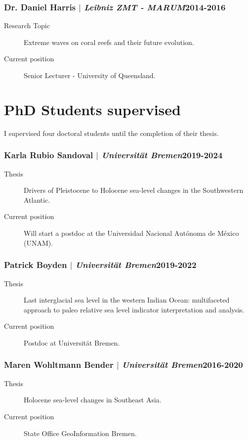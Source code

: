 \documentclass[11pt]{article}
\begin{document}
\smallskip
\subsubsection{Dr. Daniel Harris $|$ {\normalfont\textit{Leibniz ZMT - MARUM}}\hfill 2014-2016}
{\footnotesize 
\begin{description}
  \item [Research Topic] Extreme waves on coral reefs and their future evolution. 
  \item [Current position] Senior Lecturer - University of Queensland. 
\end{description}
}

\section{PhD Students supervised}
{\normalfont I supervised four doctoral students until the completion of their thesis.}\\

\subsubsection{Karla Rubio Sandoval $|$ {\normalfont\textit{Universität Bremen}}\hfill 2019-2024}
{\footnotesize 
\begin{description}
  \item [Thesis] Drivers of Pleistocene to Holocene sea-level changes in the Southwestern Atlantic.
  \item [Current position] Will start a postdoc at the Universidad Nacional Autónoma de México (UNAM). 
\end{description}
}
\smallskip

\subsubsection{Patrick Boyden $|$ {\normalfont\textit{Universität Bremen}}\hfill 2019-2022}
{\footnotesize 
\begin{description}
  \item [Thesis] Last interglacial sea level in the western Indian Ocean: multifaceted approach to paleo relative sea level indicator interpretation and analysis.
  \item [Current position] Postdoc at Universität Bremen. 
\end{description}
}
\smallskip

\subsubsection{Maren Wohltmann Bender $|$ {\normalfont\textit{Universität Bremen}}\hfill 2016-2020}
{\footnotesize 
\begin{description}
  \item [Thesis] Holocene sea-level changes in Southeast Asia.
  \item [Current position] State Office GeoInformation Bremen. 
\end{description}
}
\smallskip
\end{document}
